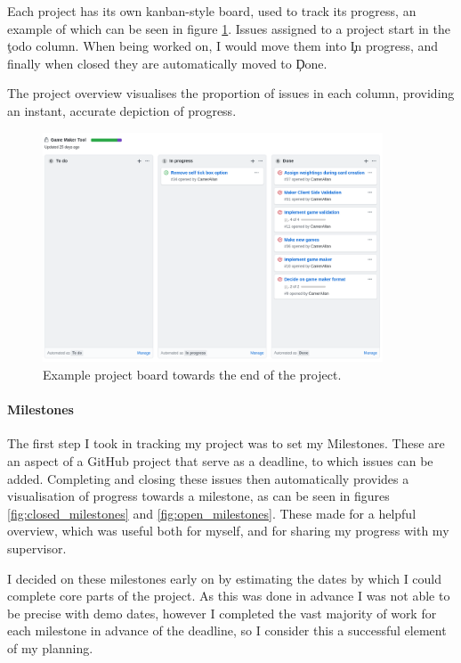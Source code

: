 Each project has its own kanban-style\cite{KBAN} board, used to track its progress, an example of which can be seen in figure \ref{fig:board}. Issues assigned to a project start in the \c{todo} column. When being worked on, I would move them into \c{In progress}, and finally when closed they are automatically moved to \c{Done}.

The project overview visualises the proportion of issues in each column, providing an instant, accurate depiction of progress.

\begin{figure}[!h]
	\centering
	\includegraphics[width=0.9\textwidth]{./images/softeng/board.png}
	\caption{Example project board towards the end of the project.}
	\label{fig:board}
\end{figure}

\paragraph{Milestones} The first step I took in tracking my project was to set my Milestones. These are an aspect of a GitHub project that serve as a deadline, to which issues can be added. 
Completing and closing these issues then automatically provides a visualisation of progress towards a milestone, as can be seen in figures \ref{fig:closed_milestones} and \ref{fig:open_milestones}. 
These made for a helpful overview, which was useful both for myself, and for sharing my progress with my supervisor.

I decided on these milestones early on by estimating the dates by which I could complete core parts of the project. As this was done in advance I was not able to be precise with demo dates, however I completed the vast majority of work for each milestone in advance of the deadline, so I consider this a successful element of my planning.

